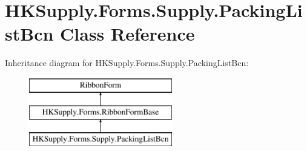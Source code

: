 \hypertarget{class_h_k_supply_1_1_forms_1_1_supply_1_1_packing_list_bcn}{}\section{H\+K\+Supply.\+Forms.\+Supply.\+Packing\+List\+Bcn Class Reference}
\label{class_h_k_supply_1_1_forms_1_1_supply_1_1_packing_list_bcn}
Inheritance diagram for H\+K\+Supply.\+Forms.\+Supply.\+Packing\+List\+Bcn\+:\begin{figure}[H]
\begin{center}
\leavevmode
\includegraphics[height=3.000000cm]{class_h_k_supply_1_1_forms_1_1_supply_1_1_packing_list_bcn}
\end{center}
\end{figure}
